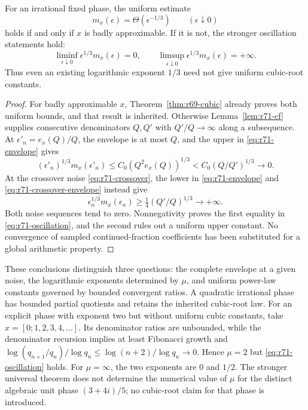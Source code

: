 \begin{theorem}\label{thm:r71-cubic-rigidity}
For an irrational fixed phase, the uniform estimate
\[
 m_x(\epsilon)=\Theta(\epsilon^{-1/3})\qquad(\epsilon\downarrow0)
\]
holds if and only if $x$ is badly approximable. If it is not, the stronger oscillation statements hold:
\begin{equation}\label{eq:r71-oscillation}
 \liminf_{\epsilon\downarrow0}\epsilon^{1/3}m_x(\epsilon)=0,
 \qquad
 \limsup_{\epsilon\downarrow0}\epsilon^{1/3}m_x(\epsilon)=+\infty.
\end{equation}
Thus even an existing logarithmic exponent $1/3$ need not give uniform cubic-root constants.
\end{theorem}
\begin{proof}
For badly approximable $x$, Theorem~\ref{thm:r69-cubic} already proves both uniform bounds, and that result is inherited. Otherwise Lemma~\ref{lem:r71-cf} supplies consecutive denominators $Q,Q'$ with $Q'/Q\to\infty$ along a subsequence. At $\epsilon'_n=e_x(Q)/Q$, the envelope is at most $Q$, and the upper in \eqref{eq:r71-envelope} gives
\[
 (\epsilon'_n)^{1/3}m_x(\epsilon'_n)
 \le C_0(Q^2e_x(Q))^{1/3}
 <C_0(Q/Q')^{1/3}\longrightarrow0.
\]
At the crossover noise \eqref{eq:r71-crossover}, the lower in \eqref{eq:r71-envelope} and \eqref{eq:r71-crossover-envelope} instead give
\[
 \epsilon_n^{1/3}m_x(\epsilon_n)
 \ge\tfrac14(Q'/Q)^{1/3}\longrightarrow+\infty.
\]
Both noise sequences tend to zero. Nonnegativity proves the first equality in \eqref{eq:r71-oscillation}, and the second rules out a uniform upper constant. No convergence of sampled continued-fraction coefficients has been substituted for a global arithmetic property.
\end{proof}

These conclusions distinguish three questions: the complete envelope at a given noise, the logarithmic exponents determined by $\mu$, and uniform power-law constants governed by bounded convergent ratios. A quadratic irrational phase has bounded partial quotients and retains the inherited cubic-root law. For an explicit phase with exponent two but without uniform cubic constants, take $x=[0;1,2,3,4,\ldots]$. Its denominator ratios are unbounded, while the denominator recursion implies at least Fibonacci growth and
$\log(q_{n+1}/q_n)/\log q_n\le\log(n+2)/\log q_n\to0$.
Hence $\mu=2$ but \eqref{eq:r71-oscillation} holds. For $\mu=\infty$, the two exponents are $0$ and $1/2$. The stronger universal theorem does not determine the numerical value of $\mu$ for the distinct algebraic unit phase $(3+4i)/5$; no cubic-root claim for that phase is introduced.

